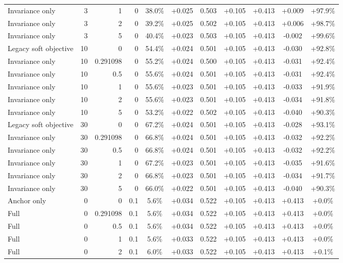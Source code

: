 \begin{table}[htbp]
\begin{tabular}{lrrrccccccc}
Invariance only & 3 & 1 & 0 & 38.0\% & +0.025 & 0.503 & +0.105 & +0.413 & +0.009 & +97.9\% \\
Invariance only & 3 & 2 & 0 & 39.2\% & +0.025 & 0.502 & +0.105 & +0.413 & +0.006 & +98.7\% \\
Invariance only & 3 & 5 & 0 & 40.4\% & +0.023 & 0.503 & +0.105 & +0.413 & -0.002 & +99.6\% \\
Legacy soft objective & 10 & 0 & 0 & 54.4\% & +0.024 & 0.501 & +0.105 & +0.413 & -0.030 & +92.8\% \\
Invariance only & 10 & 0.291098 & 0 & 55.2\% & +0.024 & 0.500 & +0.105 & +0.413 & -0.031 & +92.4\% \\
Invariance only & 10 & 0.5 & 0 & 55.6\% & +0.024 & 0.501 & +0.105 & +0.413 & -0.031 & +92.4\% \\
Invariance only & 10 & 1 & 0 & 55.6\% & +0.023 & 0.501 & +0.105 & +0.413 & -0.033 & +91.9\% \\
Invariance only & 10 & 2 & 0 & 55.6\% & +0.023 & 0.501 & +0.105 & +0.413 & -0.034 & +91.8\% \\
Invariance only & 10 & 5 & 0 & 53.2\% & +0.022 & 0.502 & +0.105 & +0.413 & -0.040 & +90.3\% \\
Legacy soft objective & 30 & 0 & 0 & 67.2\% & +0.024 & 0.501 & +0.105 & +0.413 & -0.028 & +93.1\% \\
Invariance only & 30 & 0.291098 & 0 & 66.8\% & +0.024 & 0.501 & +0.105 & +0.413 & -0.032 & +92.2\% \\
Invariance only & 30 & 0.5 & 0 & 66.8\% & +0.024 & 0.501 & +0.105 & +0.413 & -0.032 & +92.2\% \\
Invariance only & 30 & 1 & 0 & 67.2\% & +0.023 & 0.501 & +0.105 & +0.413 & -0.035 & +91.6\% \\
Invariance only & 30 & 2 & 0 & 66.8\% & +0.023 & 0.501 & +0.105 & +0.413 & -0.034 & +91.7\% \\
Invariance only & 30 & 5 & 0 & 66.0\% & +0.022 & 0.501 & +0.105 & +0.413 & -0.040 & +90.3\% \\
Anchor only & 0 & 0 & 0.1 & 5.6\% & +0.034 & 0.522 & +0.105 & +0.413 & +0.413 & +0.0\% \\
Full & 0 & 0.291098 & 0.1 & 5.6\% & +0.034 & 0.522 & +0.105 & +0.413 & +0.413 & +0.0\% \\
Full & 0 & 0.5 & 0.1 & 5.6\% & +0.034 & 0.522 & +0.105 & +0.413 & +0.413 & +0.0\% \\
Full & 0 & 1 & 0.1 & 5.6\% & +0.033 & 0.522 & +0.105 & +0.413 & +0.413 & +0.0\% \\
Full & 0 & 2 & 0.1 & 6.0\% & +0.033 & 0.522 & +0.105 & +0.413 & +0.413 & +0.1\% \\

\end{tabular}
\end{table}
